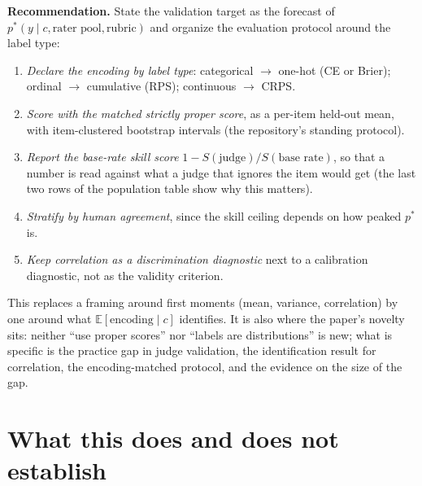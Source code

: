 \documentclass[11pt]{article}
\theoremstyle{remark}
\theoremstyle{definition}
\newcommand{\E}{\mathbb{E}}
\newcommand{\pstar}{p^{*}}
\newcommand{\1}{\mathbf{1}}
\begin{document}
\textbf{Recommendation.} State the validation target as the forecast of $\pstar(y\mid c,\text{rater pool},\text{rubric})$ and organize the evaluation protocol around the label type:
\begin{enumerate}
\item \emph{Declare the encoding by label type}: categorical $\to$ one-hot (CE or Brier); ordinal $\to$ cumulative (RPS); continuous $\to$ CRPS.
\item \emph{Score with the matched strictly proper score}, as a per-item held-out mean, with item-clustered bootstrap intervals (the repository's standing protocol).
\item \emph{Report the base-rate skill score} $1-S(\text{judge})/S(\text{base rate})$, so that a number is read against what a judge that ignores the item would get (the last two rows of the population table show why this matters).
\item \emph{Stratify by human agreement}, since the skill ceiling depends on how peaked $\pstar$ is.
\item \emph{Keep correlation as a discrimination diagnostic} next to a calibration diagnostic, not as the validity criterion.
\end{enumerate}
This replaces a framing around first moments (mean, variance, correlation) by one around what $\E[\text{encoding}\mid c]$ identifies. It is also where the paper's novelty sits: neither ``use proper scores'' nor ``labels are distributions'' is new; what is specific is the practice gap in judge validation, the identification result for correlation, the encoding-matched protocol, and the evidence on the size of the gap.

\section{What this does and does not establish}
\label{sec:limits}
\end{document}

